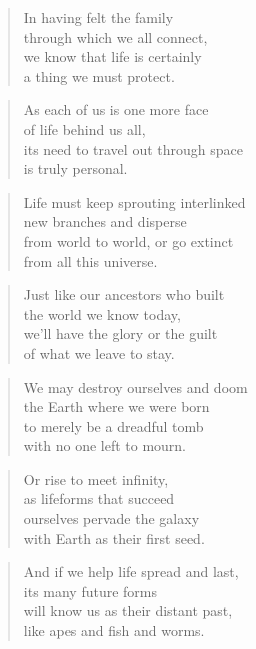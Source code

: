 \documentclass[10pt,a4paper]{article}
\begin{document}
\begin{paracol}{2}
\begin{verse}
In having felt the family\\
through which we all connect,\\
we know that life is certainly\\
a thing we must protect.
\end{verse}

\begin{verse}
As each of us is one more face\\
of life behind us all,\\
its need to travel out through space\\
is truly personal.
\end{verse}

\begin{verse}
Life must keep sprouting interlinked\\
new branches and disperse\\
from world to world, or go extinct\\
from all this universe.
\end{verse}

\begin{verse}
Just like our ancestors who built\\
the world we know today,\\
we’ll have the glory or the guilt\\
of what we leave to stay.
\end{verse}

\begin{verse}
We may destroy ourselves and doom\\
the Earth where we were born\\
to merely be a dreadful tomb\\
with no one left to mourn.
\end{verse}

\begin{verse}
Or rise to meet infinity,\\
as lifeforms that succeed\\
ourselves pervade the galaxy\\
with Earth as their first seed.
\end{verse}

\begin{verse}
And if we help life spread and last,\\
its many future forms\\
will know us as their distant past,\\
like apes and fish and worms.
\end{verse}


\end{paracol}
\end{document}
